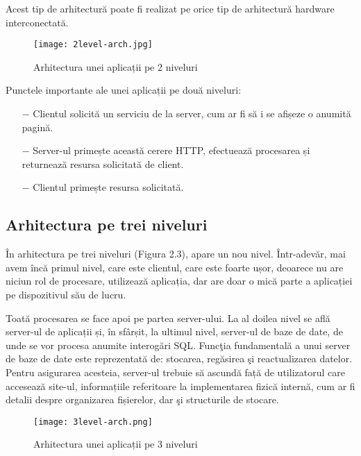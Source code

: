 Acest tip de arhitectură poate fi realizat pe orice tip de arhitectură hardware interconectată.

\begin{figure}[H]
	\begin{center}
		\texttt{[image: 2level-arch.jpg]}
		\caption{Arhitectura unei aplicații pe 2 niveluri}
	\end{center}
\end{figure}

Punctele importante ale unei aplicații pe două niveluri:

\begin{itemize}
	\addtolength{\itemindent}{1cm}
	\item[$-$]Clientul solicită un serviciu de la server, cum ar fi să i se afișeze o anumită pagină.
	\item[$-$]Server-ul primește această cerere HTTP, efectuează procesarea și returnează resursa solicitată de client.
	\item[$-$]Clientul primește resursa solicitată.
	\newline
\end{itemize}


\subsection{Arhitectura pe trei niveluri}
În arhitectura pe trei niveluri (Figura 2.3), apare un nou nivel. Într-adevăr, mai avem încă primul nivel, care este clientul, care este foarte ușor, deoarece nu are niciun rol de procesare, utilizează aplicația, dar are doar o mică parte a aplicației pe dispozitivul său de lucru.\newline

Toată procesarea se face apoi pe partea server-ului. La al doilea nivel se află server-ul de aplicații și, în sfârșit, la ultimul nivel, server-ul de baze de date, de unde se vor procesa anumite interogări SQL. Funcţia fundamentală a unui server de baze de date este reprezentată de: stocarea, regăsirea şi reactualizarea datelor. Pentru asigurarea acesteia, server-ul trebuie să ascundă față de utilizatorul care accesează site-ul, informațiile referitoare la implementarea fizică internă, cum ar fi detalii despre organizarea fișierelor, dar şi structurile de stocare.

\begin{figure}[H]
	\begin{center}
		\texttt{[image: 3level-arch.png]}
		\caption{Arhitectura unei aplicații pe 3 niveluri}
	\end{center}
\end{figure}

